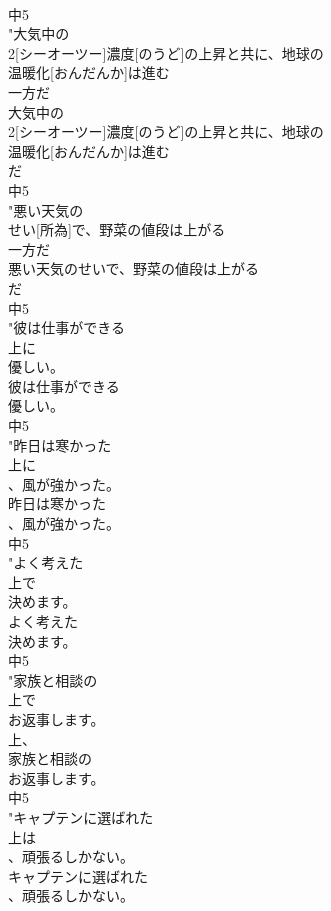 \documentclass[8pt]{extreport}
\begin{document}
\begin{CJK}{UTF8}{min}
\\	中5
\\	"大気中の
\\	2[シーオーツー]濃度[のうど]の上昇と共に、地球の
\\	温暖化[おんだんか]は進む
\\	一方だ
\\	大気中の
\\	2[シーオーツー]濃度[のうど]の上昇と共に、地球の
\\	温暖化[おんだんか]は進む
\\	だ
\\	中5
\\	"悪い天気の
\\	せい[所為]で、野菜の値段は上がる
\\	一方だ
\\	悪い天気のせいで、野菜の値段は上がる
\\	だ
\\	中5
\\	"彼は仕事ができる
\\	上に
\\	優しい。
\\	彼は仕事ができる
\\	優しい。
\\	中5
\\	"昨日は寒かった
\\	上に
\\	、風が強かった。
\\	昨日は寒かった
\\	、風が強かった。
\\	中5
\\	"よく考えた
\\	上で
\\	決めます。
\\	よく考えた
\\	決めます。
\\	中5
\\	"家族と相談の
\\	上で
\\	お返事します。
\\	上、
\\	家族と相談の
\\	お返事します。
\\	中5
\\	"キャプテンに選ばれた
\\	上は
\\	、頑張るしかない。
\\	キャプテンに選ばれた
\\	、頑張るしかない。

\end{CJK}
\end{document}
